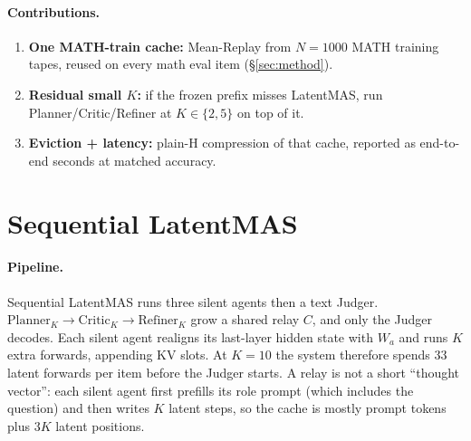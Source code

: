 \documentclass[11pt]{article}
\begin{document}
\paragraph{Contributions.}
\begin{enumerate}
\item \textbf{One MATH-train cache:} Mean-Replay from $N{=}1000$ MATH
training tapes, reused on every math eval item (\S\ref{sec:method}).
\item \textbf{Residual small $K$:} if the frozen prefix misses
LatentMAS, run Planner/Critic/Refiner at $K\in\{2,5\}$ on top of it.
\item \textbf{Eviction + latency:} plain-H compression of that cache,
reported as end-to-end seconds at matched accuracy.
\end{enumerate}

\section{Sequential LatentMAS}
\label{sec:setup}

\paragraph{Pipeline.}
Sequential LatentMAS runs three silent agents then a text Judger.
$\mathrm{Planner}_K \to \mathrm{Critic}_K \to \mathrm{Refiner}_K$ grow a
shared relay $C$, and only the Judger decodes.
Each silent agent realigns its last-layer hidden state with $W_a$ and
runs $K$ extra forwards, appending KV slots.
At $K{=}10$ the system therefore spends $33$ latent forwards per item
before the Judger starts.
A relay is not a short ``thought vector'': each silent agent first
prefills its role prompt (which includes the question) and then writes
$K$ latent steps, so the cache is mostly prompt tokens plus $3K$ latent
positions.
\end{document}
